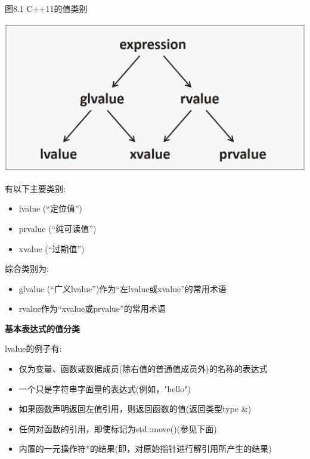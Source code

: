 \hspace*{\fill} \par %
图8.1 C++11的值类别\par

\begin{center}
	\includegraphics[width=1.0\textwidth]{content/1/chapter8/images/1}
\end{center}

有以下主要类别:\par

\begin{itemize}
	\item lvalue (“定位值”)
	\item prvalue (“纯可读值”)
	\item xvalue (“过期值”)
\end{itemize}

综合类别为:\par

\begin{itemize}
	\item glvalue (“广义lvalue”)作为“左lvalue或xvalue”的常用术语
	\item rvalue作为“xvalue或prvalue”的常用术语
\end{itemize}

\hspace*{\fill} \par %
\textbf{基本表达式的值分类}\par

lvalue的例子有:\par

\begin{itemize}
	\item 仅为变量、函数或数据成员(除右值的普通值成员外)的名称的表达式
	\item 一个只是字符串字面量的表达式(例如，"hello")
	\item 如果函数声明返回左值引用，则返回函数的值(返回类型type \&)
	\item 任何对函数的引用，即使标记为std::move()(参见下面)
	\item 内置的一元操作符*的结果(即，对原始指针进行解引用所产生的结果)
\end{itemize}

